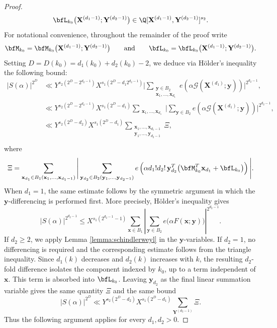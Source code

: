 \documentclass[12pt,reqno]{amsart}
\theoremstyle{definition}
\theoremstyle{remark}
\numberwithin{equation}{section}
\def\bfx{{\mathbf x}}
\def\bfy{{\mathbf y}}
\def\bfX{{\mathbf X}}
\def\bfY{{\mathbf Y}}
\def\calG{{\mathcal G}}
\def\a{{\alpha}} \def\bfalp{{\boldsymbol \alpha}} \def\atil{{\widetilde \alpha}}
\begin{document}
\begin{proof}
    \[
        \bfL_{k_0}\bigl(\bfX^{(d_1-1)};\bfY^{(d_2-1)}\bigr)
        \in \Q[\bfX^{(d_1-1)},\bfY^{(d_2-1)}]^{s_2}.
    \]
    For notational convenience, throughout the remainder of the proof write
    \[
        \bfM_{k_0}
        =\bfM_{k_0}\bigl(\bfX^{(d_1-1)};\bfY^{(d_2-1)}\bigr)
        \qquad\text{and}\qquad
        \bfL_{k_0}=\bfL_{k_0}\bigl(\bfX^{(d_1-1)};\bfY^{(d_2-1)}\bigr).
    \]
    Setting $D = D(k_0) = d_1(k_0)+d_2(k_0)-2$, we deduce via H\"{o}lder's inequality the following bound:
    \begin{align*}
        |S(\a)|^{2^{D}} &\ll Y^{s_2(2^ {D}-2^{d_2-1})} X^{s_1(2^{D}-d_1 2^{d_2 -1})} \Big|\sum_{\substack{\bfy \in B_2 \\ \bfx_1,\ldots,\bfx_{d_1}}} e\left( \a \calG(\bfX^{(d_1)};\bfy) \right) \Big|^{2^{d_2-1}}, \\
        &\ll Y^{s_2(2^{D}-2^{d_2-1})} X^{s_1(2^{D}-d_1)} \sum_{\substack{\bfx_1,\ldots,\bfx_{d_1}}}\Big| \sum_{\bfy \in B_2} e\left( \a \calG(\bfX^{(d_1)};\bfy) \right) \Big|^{2^{d_2-1}}, \\
        &\ll Y^{s_2(2^{D}-d_2)} X^{s_1(2^{D}-d_1)} \sum_{\substack{ \bfx_1,\ldots,\bfx_{d_1-1} \\ \bfy_1,\ldots,\bfy_{d_2-1}}}\Xi, \\
    \end{align*}
    where
    \begin{equation*}
    \Xi = \sum_{\bfx_{d_1}\in
    B_1(\bfx_1,\ldots,\bfx_{d_1-1})}
    \Bigg|
    \sum_{\bfy_{d_2}\in
    B_2(\bfy_1,\ldots,\bfy_{d_2-1})} e\left(
        \a d_1!d_2!\,
        \bfy_{d_2}^{T}
        \bigl(
            \bfM_{k_0}^{T}\bfx_{d_1}+\bfL_{k_0}
        \bigr)
    \right)
    \Bigg|.
    \end{equation*}
    When $d_1=1$, the same estimate follows by the symmetric argument in
    which the $\bfy$-differencing is performed first.  More precisely,
    H\"older's inequality gives
    \[
        |S(\a)|^{2^{d_2-1}}
        \leq
        X^{s_1(2^{d_2-1}-1)}
        \sum_{\bfx\in B_1}
        \left|
            \sum_{\bfy\in B_2}e\bigl(\a F(\bfx;\bfy)\bigr)
        \right|^{2^{d_2-1}}.
    \]
    If $d_2\geq2$, we apply Lemma \ref{lemma:schindlerweyl} in the
    $\bfy$-variables.  If $d_2=1$, no differencing is required and the
    corresponding estimate follows from the triangle inequality.  Since
    $d_1(k)$ decreases and $d_2(k)$ increases with $k$, the resulting
    $d_2$-fold difference isolates the component indexed by $k_0$, up to a
    term independent of $\bfx$.  This term is absorbed into
    $\bfL_{k_0}$.  Leaving $\bfy_{d_2}$ as the final linear summation
    variable gives the same quantity $\Xi$ and the same bound
    \[
        |S(\a)|^{2^D}
        \ll
        Y^{s_2(2^D-d_2)}X^{s_1(2^D-d_1)}
        \sum_{\bfY^{(d_2-1)}}\Xi.
    \]
    Thus the following argument applies for every $d_1,d_2>0$.


\end{proof}
\end{document}
